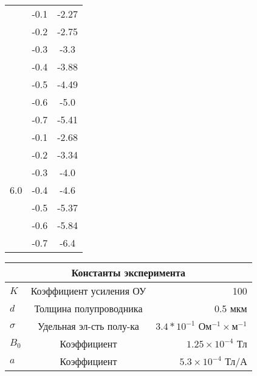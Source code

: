 \begin{table}[htp!]
{\begin{tabular}{|c|c|c|}
            & -0.1 & -2.27\\
            \cline{2-3}
            & -0.2 & -2.75\\
            \cline{2-3}
            & -0.3 & -3.3\\
            \cline{2-3}
            & -0.4 & -3.88\\
            \cline{2-3}
            & -0.5 & -4.49\\
            \cline{2-3}
            & -0.6 & -5.0\\
            \cline{2-3}
            & -0.7 & -5.41\\
            \hline
            \multirow{7}{*}{6.0}
            & -0.1 & -2.68\\
            \cline{2-3}
            & -0.2 & -3.34\\
            \cline{2-3}
            & -0.3 & -4.0\\
            \cline{2-3}
            & -0.4 & -4.6\\
            \cline{2-3}
            & -0.5 & -5.37\\
            \cline{2-3}
            & -0.6 & -5.84\\
            \cline{2-3}
            & -0.7 & -6.4\\
            \hline
            
        \end{tabular}
        
        \quad
        \begin{tabular}{|l|c|r|}
            \hline
            \multicolumn{3}{|c|}{Константы эксперимента}\\
            \hline
            $ K $ & Коэффициент усиления ОУ & 100\\
            \hline
            $ d $ & Толщина полупроводника & 0.5 мкм\\
            \hline
            $ \sigma $ & Удельная эл-сть полу-ка & $ 3.4 * 10^{-1} $ Ом$^{-1} \times$м$^{-1}$\\
            \hline
            $ B_0 $ & Коэффициент & $ 1.25 \times 10^{-4} $ Тл\\
            \hline
            $ a $ & Коэффициент & $ 5.3 \times 10^{-4} $ Тл/А\\
            \hline
        \end{tabular}
    }  %
\end{table}
